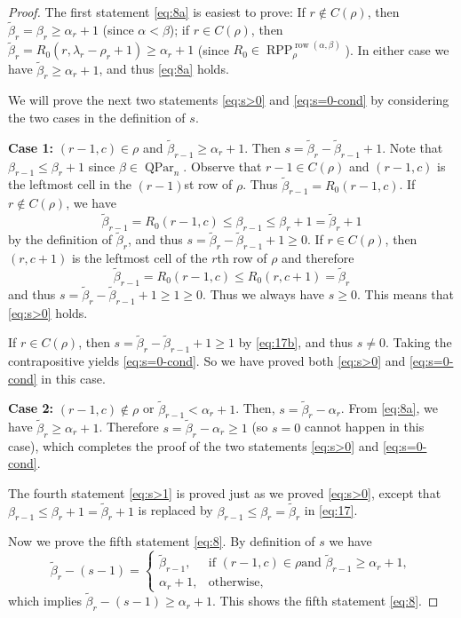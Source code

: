 \documentclass[12pt]{amsart}
\numberwithin{equation}{section}
\theoremstyle{definition}
\newcommand\wb{\widetilde{\beta}}
\newcommand\row{\operatorname{row}}
\newcommand\QPar{\operatorname{QPar}}
\newcommand\RPP{\operatorname{RPP}}
\begin{document}
\begin{proof}
  The first statement \eqref{eq:8a} is easiest to prove:
  If $r\notin C(\rho)$, then $\wb_r=\beta_r\ge\alpha_r+1$
  (since $\alpha < \beta$);
  if $r\in C(\rho)$, then $\wb_r=R_0(r,\lambda_r-\rho_r+1)\ge\alpha_r+1$
  (since $R_0 \in \RPP^{\row(\alpha,\beta)}_{\rho}$).
  In either case we have $\wb_r\ge \alpha_r+1$,
  and thus \eqref{eq:8a} holds.

  We will prove the next two statements \eqref{eq:s>0} and \eqref{eq:s=0-cond}
  by considering the two cases in the definition of $s$.

  \textbf{Case 1:}
  $(r-1,c)\in\rho$ and $\wb_{r-1}\ge\alpha_r+1$. Then
  $s=\wb_r-\wb_{r-1}+1$. Note that $\beta_{r-1} \le \beta_r+1$
  since $\beta \in \QPar_n$.
  Observe that $r-1\in C(\rho)$ and $(r-1,c)$ is the
  leftmost cell in the $(r-1)$st row of $\rho$. Thus $\wb_{r-1}=R_0(r-1,c)$. If
  $r\notin C(\rho)$, we have
  \begin{equation}
    \label{eq:17}
  \wb_{r-1}=R_0(r-1,c) \le \beta_{r-1} \le \beta_r+1 = \wb_r+1
  \end{equation}
  by the definition of $\wb_r$, and thus
  $s=\wb_r-\wb_{r-1}+1\ge0$.
  If $r\in C(\rho)$, then $(r,c+1)$ is the leftmost cell of the $r$th row of
  $\rho$ and therefore
  \begin{equation}
    \label{eq:17b}
  \wb_{r-1}=R_0(r-1,c)  \le R_0(r,c+1) = \wb_r
  \end{equation}
  and thus $s=\wb_r-\wb_{r-1}+1\ge1\ge 0$.
Thus we always have $s\ge 0$.
This means that \eqref{eq:s>0} holds.

If $r \in C(\rho)$, then $s=\wb_r-\wb_{r-1}+1 \ge 1$ by \eqref{eq:17b},
and thus $s \neq 0$. Taking the contrapositive yields \eqref{eq:s=0-cond}.
So we have proved both \eqref{eq:s>0} and \eqref{eq:s=0-cond} in this case.

\textbf{Case 2:}
$(r-1,c)\notin\rho$ or $\wb_{r-1}<\alpha_r+1$.
Then, $s=\wb_r-\alpha_r$. From \eqref{eq:8a},
we have $\wb_r \ge \alpha_r + 1$.
Therefore $s=\wb_r-\alpha_r \ge 1$ (so $s=0$ cannot happen in this case),
which completes the proof of the
two statements \eqref{eq:s>0} and \eqref{eq:s=0-cond}.

The fourth statement \eqref{eq:s>1} is proved just as we proved
\eqref{eq:s>0}, except that $\beta_{r-1} \le \beta_r+1 = \wb_r+1$
is replaced by $\beta_{r-1} \leq \beta_r = \wb_r$ in \eqref{eq:17}.

Now we prove the fifth statement \eqref{eq:8}. By definition of $s$ we have
\begin{equation}
  \label{eq:13}
\wb_r-(s-1) = \begin{cases}
  \wb_{r-1}, & \mbox{if $(r-1,c)\in\rho$
  and $\wb_{r-1}\ge\alpha_r+1$} ,\\
\alpha_r+1, &\mbox{otherwise},
\end{cases}
\end{equation}
which implies $\wb_r-(s-1)\ge\alpha_r+1$. This shows the fifth statement
\eqref{eq:8}.


\end{proof}
\end{document}
